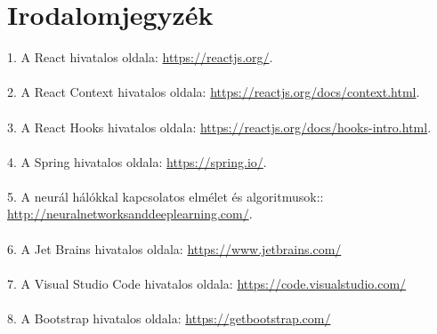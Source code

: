 \chapter*{Irodalomjegyzék}\label{ch:MAT}

1. A React hivatalos oldala: \href{https://reactjs.org/}{https://reactjs.org/}. \\ \\
2. A React Context hivatalos oldala: \href{https://reactjs.org/docs/context.html}{https://reactjs.org/docs/context.html}. \\ \\
3. A React Hooks hivatalos oldala: \href{https://reactjs.org/docs/hooks-intro.html}{https://reactjs.org/docs/hooks-intro.html}. \\ \\
4. A Spring hivatalos oldala: \href{https://spring.io/}{https://spring.io/}. \\ \\
5. A neurál hálókkal kapcsolatos elmélet és algoritmusok:: \href{http://neuralnetworksanddeeplearning.com/}{http://neuralnetworksanddeeplearning.com/}. \\ \\
6. A Jet Brains hivatalos oldala: \href{https://www.jetbrains.com/}{https://www.jetbrains.com/} \\ \\
7. A Visual Studio Code hivatalos oldala: \href{https://code.visualstudio.com/}{https://code.visualstudio.com/} \\ \\
8. A Bootstrap hivatalos oldala: \href{https://getbootstrap.com/}{https://getbootstrap.com/}



